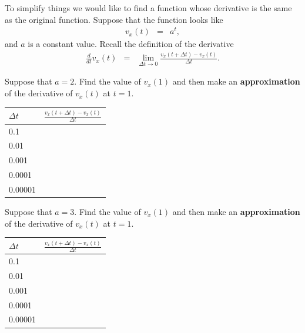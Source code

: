 \begin{problem}
\item To simplify things we would like to find a function whose
  derivative is the same as the original function.
  Suppose that the function looks like
  \begin{eqnarray*}
    v_x(t) & = & a^{t},
  \end{eqnarray*}
  and $a$ is a constant value. Recall the definition of the derivative
  \begin{eqnarray*}
    \frac{d}{dt} v_x(t) & = & \lim_{\Delta t \rightarrow 0}
                              \frac{v_x(t+\Delta t) - v_x(t)}{\Delta t}.
  \end{eqnarray*}

  \begin{subproblem}
  \item Suppose that $a=2$. Find the value of $v_x(1)$ and then make
    an \textbf{approximation} of the derivative of $v_x(t)$ at $t=1$.

    \begin{tabular}{l|l}
      $\Delta t$ & $\frac{v_x(t+\Delta t) - v_x(t)}{\Delta t}$ \\ \hline
      0.1 & \\      [10pt]
      0.01 & \\     [10pt]
      0.001 & \\    [10pt]
      0.0001 & \\   [10pt]
      0.00001 & \\
    \end{tabular}

    \vfill
  \item Suppose that $a=3$. Find the value of $v_x(1)$ and then make
    an \textbf{approximation} of the derivative of $v_x(t)$ at $t=1$.

    \begin{tabular}{l|l}
      $\Delta t$ & $\frac{v_x(t+\Delta t) - v_x(t)}{\Delta t}$ \\ \hline
      0.1 & \\      [10pt]
      0.01 & \\     [10pt]
      0.001 & \\    [10pt]
      0.0001 & \\   [10pt]
      0.00001 & \\
    \end{tabular}


\end{subproblem}
\end{problem}
